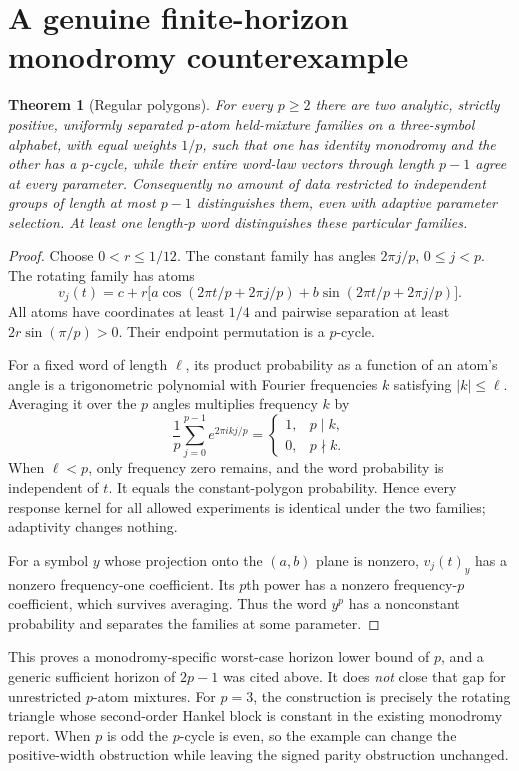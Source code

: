 \documentclass[11pt]{article}
\newtheorem{theorem}{Theorem}[section]
\theoremstyle{remark}\newtheorem{remark}[theorem]{Remark}
\begin{document}
\section{A genuine finite-horizon monodromy counterexample}
\begin{theorem}[Regular polygons]\label{thm:polygon}
For every $p\geq2$ there are two analytic, strictly positive, uniformly separated $p$-atom held-mixture families on a three-symbol alphabet, with equal weights $1/p$, such that one has identity monodromy and the other has a $p$-cycle, while their entire word-law vectors through length $p-1$ agree at \emph{every} parameter. Consequently no amount of data restricted to independent groups of length at most $p-1$ distinguishes them, even with adaptive parameter selection. At least one length-$p$ word distinguishes these particular families.
\end{theorem}
\begin{proof}
Choose $0<r\leq1/12$. The constant family has angles $2\pi j/p$, $0\leq j<p$. The rotating family has atoms
\[
 v_j(t)=c+r\big[a\cos(2\pi t/p+2\pi j/p)+b\sin(2\pi t/p+2\pi j/p)\big].
\]
All atoms have coordinates at least $1/4$ and pairwise separation at least $2r\sin(\pi/p)>0$. Their endpoint permutation is a $p$-cycle.

For a fixed word of length $\ell$, its product probability as a function of an atom's angle is a trigonometric polynomial with Fourier frequencies $k$ satisfying $|k|\leq\ell$. Averaging it over the $p$ angles multiplies frequency $k$ by
\[
 \frac1p\sum_{j=0}^{p-1}e^{2\pi i kj/p}
 =\begin{cases}1,&p\mid k,\\0,&p\nmid k.\end{cases}
\]
When $\ell<p$, only frequency zero remains, and the word probability is independent of $t$. It equals the constant-polygon probability. Hence every response kernel for all allowed experiments is identical under the two families; adaptivity changes nothing.

For a symbol $y$ whose projection onto the $(a,b)$ plane is nonzero, $v_j(t)_y$ has a nonzero frequency-one coefficient. Its $p$th power has a nonzero frequency-$p$ coefficient, which survives averaging. Thus the word $y^p$ has a nonconstant probability and separates the families at some parameter.
\end{proof}
This proves a monodromy-specific worst-case horizon lower bound of $p$, and a generic sufficient horizon of $2p-1$ was cited above. It does \emph{not} close that gap for unrestricted $p$-atom mixtures. For $p=3$, the construction is precisely the rotating triangle whose second-order Hankel block is constant in the existing monodromy report. When $p$ is odd the $p$-cycle is even, so the example can change the positive-width obstruction while leaving the signed parity obstruction unchanged.
\end{document}
